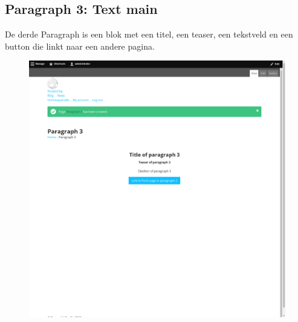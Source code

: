 \subsection{Paragraph 3: Text main}
De derde Paragraph is een blok met een titel, een teaser, een tekstveld en een button die linkt naar een andere pagina.
\begin{figure}[h]
\includegraphics[width=1\textwidth]{img/p003.png}
\end{figure}

\clearpage
